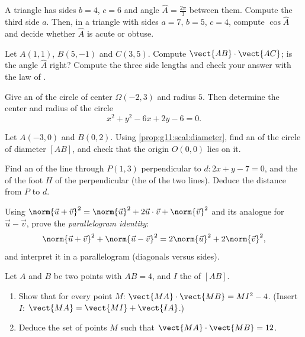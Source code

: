 \begin{exercise}[$\star\star$]\label{exo:g11:scal:5}
A triangle has sides $b = 4$, $c = 6$ and angle
$\widehat A = \frac{2\pi}{3}$ between them. Compute the third side $a$.
Then, in a triangle with sides $a = 7$, $b = 5$, $c = 4$, compute
$\cos\widehat A$ and decide whether $\widehat A$ is acute or obtuse.
\end{exercise}

\begin{exercise}[$\star\star$]\label{exo:g11:scal:6}
Let $A(1, 1)$, $B(5, -1)$ and $C(3, 5)$. Compute
$\vect{AB} \cdot \vect{AC}$; is the angle $\widehat A$ right? Compute the
three side lengths and check your answer with the law of .
\end{exercise}

\begin{exercise}[$\star\star$]\label{exo:g11:scal:7}
Give an  of the circle of center $\Omega(-2, 3)$ and radius $5$.
Then determine the center and radius of the circle
\[
x^2 + y^2 - 6x + 2y - 6 = 0 .
\]
\end{exercise}

\begin{exercise}[$\star\star$]\label{exo:g11:scal:8}
Let $A(-3, 0)$ and $B(0, 2)$. Using \cref{prop:g11:scal:diameter}, find
an  of the circle of diameter $[AB]$, and check that the origin
$O(0,0)$ lies on it.
\end{exercise}

\begin{exercise}[$\star\star$]\label{exo:g11:scal:9}
Find an  of the line through $P(1, 3)$ perpendicular to
$d : 2x + y - 7 = 0$, and the  of the foot $H$ of the
perpendicular (the  of the two lines). Deduce the distance
from $P$ to $d$.
\end{exercise}

\begin{exercise}[$\star\star$]\label{exo:g11:scal:10}
Using $\norm{\vec u + \vec v}^2 = \norm{\vec u}^2 + 2\vec u\cdot\vec v +
\norm{\vec v}^2$ and its analogue for $\vec u - \vec v$, prove the
\emph{parallelogram identity}:
\[
\norm{\vec u + \vec v}^2 + \norm{\vec u - \vec v}^2
= 2\norm{\vec u}^2 + 2\norm{\vec v}^2 ,
\]
and interpret it in a parallelogram (diagonals versus sides).
\end{exercise}

\begin{exercise}[$\star\star\star$]\label{exo:g11:scal:11}
Let $A$ and $B$ be two points with $AB = 4$, and $I$ the  of
$[AB]$.
\begin{enumerate}
  \item Show that for every point $M$:
        $\vect{MA}\cdot\vect{MB} = MI^2 - 4$.
        (Insert $I$: $\vect{MA} = \vect{MI} + \vect{IA}$.)
  \item Deduce the set of points $M$ such that
        $\vect{MA}\cdot\vect{MB} = 12$.
\end{enumerate}
\end{exercise}
